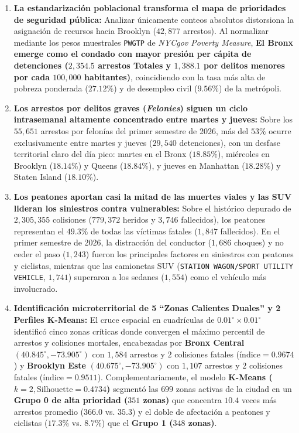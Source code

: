 \documentclass[11pt,a4paper]{article}
\begin{document}
\begin{enumerate}
    \item \textbf{La estandarización poblacional transforma el mapa de prioridades de seguridad pública:}
    Analizar únicamente conteos absolutos distorsiona la asignación de recursos hacia Brooklyn ($42,877$ arrestos). Al normalizar mediante los pesos muestrales \texttt{PWGTP} de \textit{NYCgov Poverty Measure}, \textbf{El Bronx emerge como el condado con mayor presión per cápita de detenciones ($2,354.5$ arrestos Totales y $1,388.1$ por delitos menores por cada $100,000$ habitantes)}, coincidiendo con la tasa más alta de pobreza ponderada ($27.12\%$) y de desempleo civil ($9.56\%$) de la metrópoli.

    \item \textbf{Los arrestos por delitos graves (\textit{Felonies}) siguen un ciclo intrasemanal altamente concentrado entre martes y jueves:}
    Sobre los $55,651$ arrestos por felonías del primer semestre de 2026, más del $53\%$ ocurre exclusivamente entre martes y jueves ($29,540$ detenciones), con un desfase territorial claro del día pico: martes en el Bronx ($18.85\%$), miércoles en Brooklyn ($18.14\%$) y Queens ($18.84\%$), y jueves en Manhattan ($18.28\%$) y Staten Island ($18.10\%$).

    \item \textbf{Los peatones aportan casi la mitad de las muertes viales y las SUV lideran los siniestros contra vulnerables:}
    Sobre el histórico depurado de $2,305,355$ colisiones ($779,372$ heridos y $3,746$ fallecidos), los peatones representan el $49.3\%$ de todas las víctimas fatales ($1,847$ fallecidos). En el primer semestre de 2026, la distracción del conductor ($1,686$ choques) y no ceder el paso ($1,243$) fueron los principales factores en siniestros con peatones y ciclistas, mientras que las camionetas SUV (\texttt{STATION WAGON/SPORT UTILITY VEHICLE}, $1,741$) superaron a los sedanes ($1,554$) como el vehículo más involucrado.

    \item \textbf{Identificación microterritorial de 5 ``Zonas Calientes Duales'' y 2 Perfiles K-Means:}
    El cruce espacial en cuadrículas de $0.01^\circ \times 0.01^\circ$ identificó cinco zonas críticas donde convergen el máximo percentil de arrestos y colisiones mortales, encabezadas por \textbf{Bronx Central} $(40.845^\circ, -73.905^\circ)$ con $1,584$ arrestos y $2$ colisiones fatales ($\text{índice} = 0.9674$) y \textbf{Brooklyn Este} $(40.675^\circ, -73.905^\circ)$ con $1,107$ arrestos y $2$ colisiones fatales ($\text{índice} = 0.9511$). Complementariamente, el modelo \textbf{K-Means ($k=2, \text{Silhouette}=0.4734$)} segmentó las $699$ zonas activas de la ciudad en un \textbf{Grupo 0 de alta prioridad ($351$ zonas)} que concentra $10.4$ veces más arrestos promedio ($366.0$ vs. $35.3$) y el doble de afectación a peatones y ciclistas ($17.3\%$ vs. $8.7\%$) que el \textbf{Grupo 1 ($348$ zonas)}.


\end{enumerate}
\end{document}
